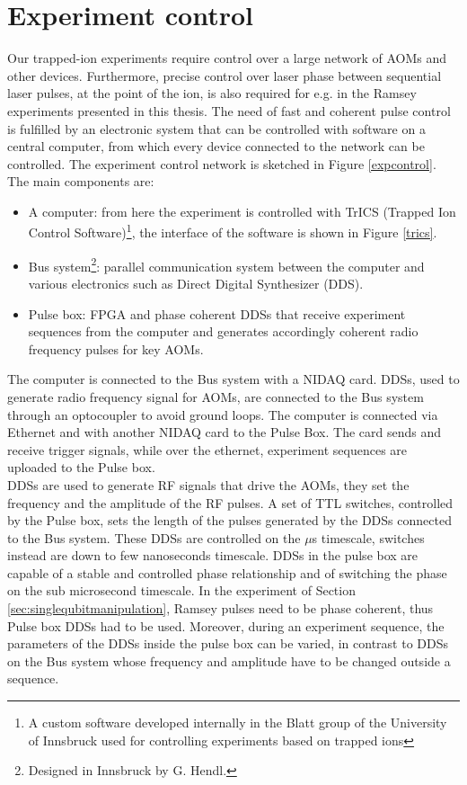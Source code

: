 \section{Experiment control}
\label{sec:expcontrol}
Our trapped-ion experiments require control over a large network of AOMs and other devices. Furthermore, precise control over laser phase between sequential laser pulses, at the point of the ion, is also required for e.g. in the Ramsey experiments presented in this thesis. The need of fast and coherent pulse control is fulfilled by an electronic system that can be controlled with software on a central computer, from which every device connected to the network can be controlled. The experiment control network is sketched in Figure \ref{expcontrol}. The main components are:
\begin{itemize}
\item A computer: from here the experiment is controlled with TrICS (Trapped Ion Control Software)\footnote{A custom software developed internally in the Blatt  group of the University of Innsbruck used for controlling experiments based on trapped ions}, the interface of the software is shown in Figure \ref{trics}.
\item Bus system\footnote{Designed in Innsbruck by G. Hendl.}: parallel communication system between the computer and various electronics such as Direct Digital Synthesizer (DDS).
\item Pulse box: FPGA and phase coherent DDSs that receive experiment sequences from the computer and generates accordingly coherent radio frequency pulses for key AOMs.
\end{itemize}
The computer is connected to the Bus system with a NIDAQ card. DDSs, used to generate radio frequency signal for AOMs, are connected to the Bus system through an optocoupler to avoid ground loops. The computer is connected via Ethernet and with another NIDAQ card to the Pulse Box. The card sends and receive trigger signals, while over the ethernet, experiment sequences are uploaded to the Pulse box.\\
DDSs are used to generate RF signals that drive the AOMs, they set the frequency and the amplitude of the RF pulses. A set of TTL switches, controlled by the Pulse box, sets the length of the pulses generated by the DDSs connected to the Bus system. These DDSs are controlled on the $\mu$s timescale, switches instead are down to few nanoseconds timescale. DDSs in the pulse box are capable of a stable and controlled phase relationship and of switching the phase on the sub microsecond timescale. In the experiment of Section \ref{sec:singlequbitmanipulation}, Ramsey pulses need to be phase coherent, thus Pulse box DDSs had to be used. Moreover, during an experiment sequence, the parameters of the DDSs inside the pulse box can be varied, in contrast to DDSs on the Bus system whose frequency and amplitude have to be changed outside a sequence.\\
